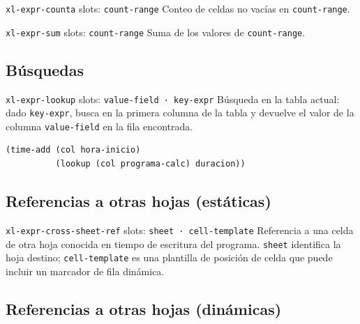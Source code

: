\documentclass[12pt,a4paper]{report}
\begin{document}
\vspace{0.5em}

\begin{nodobox}{\texttt{xl-expr-counta} \quad \small\textmd{slots:} \texttt{count-range}}
Conteo de celdas no vacías en \texttt{count-range}.
\end{nodobox}

\vspace{0.5em}

\begin{nodobox}{\texttt{xl-expr-sum} \quad \small\textmd{slots:} \texttt{count-range}}
Suma de los valores de \texttt{count-range}.
\end{nodobox}

\subsection{Búsquedas}

\begin{nodobox}{\texttt{xl-expr-lookup} \quad \small\textmd{slots:} \texttt{value-field · key-expr}}
Búsqueda en la tabla actual: dado \texttt{key-expr}, busca en la primera columna de la tabla y devuelve el valor de la columna \texttt{value-field} en la fila encontrada.

\begin{lstlisting}
(time-add (col hora-inicio)
          (lookup (col programa-calc) duracion))
\end{lstlisting}
\end{nodobox}

\subsection{Referencias a otras hojas (estáticas)}

\begin{nodobox}{\texttt{xl-expr-cross-sheet-ref} \quad \small\textmd{slots:} \texttt{sheet · cell-template}}
Referencia a una celda de otra hoja conocida en tiempo de escritura del programa. \texttt{sheet} identifica la hoja destino; \texttt{cell-template} es una plantilla de posición de celda que puede incluir un marcador de fila dinámica.
\end{nodobox}

\subsection{Referencias a otras hojas (dinámicas)}
\end{document}
